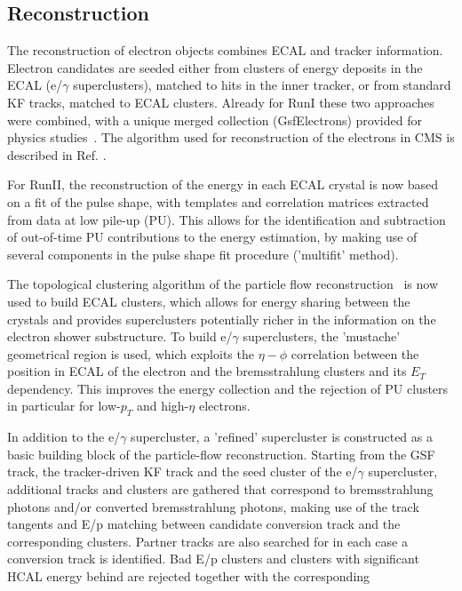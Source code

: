 \subsection{Reconstruction}
The reconstruction of electron \cite{cms:38e_electron_reco}  objects combines ECAL and tracker information.
Electron candidates are seeded either from clusters of energy
deposits in the ECAL (e/$\gamma$ superclusters), matched to hits in the inner
tracker, or from standard KF tracks, matched to ECAL clusters. Already for
RunI these two approaches were combined, with a unique merged collection
(GsfElectrons) provided for physics studies~\cite{cms:38ea}. The algorithm used for reconstruction of the electrons in CMS is described in 
Ref. \cite{cms:38e_electron_reco_2,cms:38e_electron_reco_3}.
\par
For RunII, the reconstruction of the energy in each ECAL crystal is now
based on a fit of the pulse shape, with templates and correlation matrices
extracted from data at low pile-up (PU). This allows for the identification and
subtraction of out-of-time PU contributions to the energy estimation, by making
use of several components in the pulse shape fit procedure ('multifit' method).
\par
The topological clustering algorithm of the particle flow
reconstruction~\cite{CMS-PAS-PFT-09-001,CMS-PAS-PFT-10-001} is now used to build ECAL clusters, which
allows for energy sharing between the crystals and provides superclusters
potentially richer in the information on the electron shower substructure. To build
e/$\gamma$ superclusters, the 'mustache' geometrical region is used, which exploits
the $\eta-\phi$ correlation between the position in ECAL of the electron
and the bremsstrahlung clusters and its $E_T$ dependency. This improves the
energy collection and the rejection of PU clusters in particular for low-$p_T$
and high-$\eta$ electrons.
\par
In addition to the e/$\gamma$ supercluster, a 'refined' supercluster is
constructed as a basic building block of the particle-flow reconstruction.
Starting from the GSF track, the tracker-driven KF track and the seed cluster of
the e/$\gamma$ supercluster, additional tracks and clusters are gathered that
correspond to bremsstrahlung photons and/or converted bremsstrahlung photons,
making use of the track tangents and E/p matching between candidate conversion
track and the corresponding clusters. Partner tracks are also searched for in
each case a conversion track is identified. Bad E/p clusters and clusters with
significant HCAL energy behind are rejected together with the corresponding
